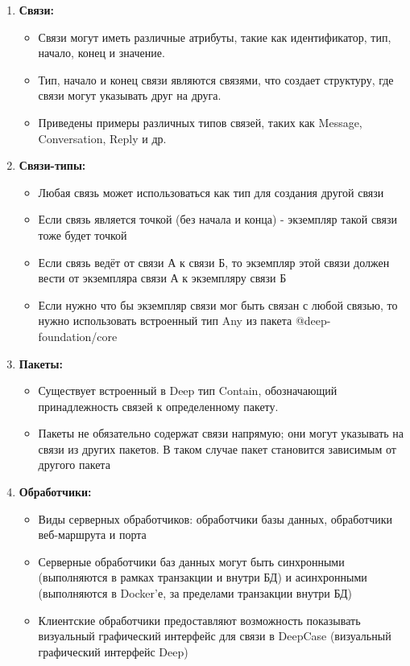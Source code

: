 \documentclass{article}
\begin{document}
\begin{enumerate}
  \item \textbf{Связи:}
        \begin{itemize}
          \item Связи могут иметь различные атрибуты, такие как идентификатор,
                тип, начало, конец и значение.
          \item Тип, начало и конец связи являются связями, что создает
                структуру, где связи могут указывать друг на друга.
          \item Приведены примеры различных типов связей, таких как Message,
                Conversation, Reply и др.
        \end{itemize}

  \item \textbf{Связи-типы:}
        \begin{itemize}
          \item Любая связь может использоваться как тип для создания другой
                связи
          \item Если связь является точкой (без начала и конца) - экземпляр
                такой связи тоже будет точкой
          \item Если связь ведёт от связи А к связи Б, то экземпляр этой связи
                должен вести от экземпляра связи А к экземпляру связи Б
          \item Если нужно что бы экземпляр связи мог быть связан с любой
                связью,
                то нужно использовать встроенный тип Any из пакета
                @deep-foundation/core
        \end{itemize}

  \item \textbf{Пакеты:}
        \begin{itemize}
          \item Существует встроенный в Deep тип Contain, обозначающий
                принадлежность связей к определенному пакету.
          \item Пакеты не обязательно содержат связи напрямую; они могут
                указывать на связи из других пакетов. В таком случае пакет становится зависимым от другого пакета
        \end{itemize}

  \item \textbf{Обработчики:}
        \begin{itemize}
          \item Виды серверных обработчиков: обработчики базы данных,
                обработчики веб-маршрута и порта
          \item Серверные обработчики баз данных могут быть синхронными (выполняются в рамках транзакции и внутри БД) и асинхронными (выполняются в Docker'е, за пределами транзакции внутри БД)
          \item Клиентские обработчики предоставляют возможность показывать
                визуальный графический интерфейс для связи в DeepCase
                (визуальный графический
                интерфейс Deep)
        \end{itemize}


\end{enumerate}
\end{document}
